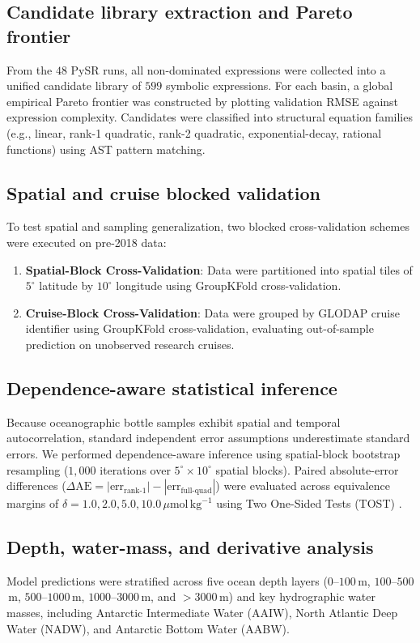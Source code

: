 

\subsection{Candidate library extraction and Pareto frontier}
From the $48$ PySR runs, all non-dominated expressions were collected into a unified candidate library of $599$ symbolic expressions. For each basin, a global empirical Pareto frontier was constructed by plotting validation RMSE against expression complexity. Candidates were classified into structural equation families (e.g., linear, rank-1 quadratic, rank-2 quadratic, exponential-decay, rational functions) using AST pattern matching.

\subsection{Spatial and cruise blocked validation}
To test spatial and sampling generalization, two blocked cross-validation schemes were executed on pre-2018 data:
\begin{enumerate}[label=(\roman*)]
\item \textbf{Spatial-Block Cross-Validation}: Data were partitioned into spatial tiles of $5^\circ$ latitude by $10^\circ$ longitude using GroupKFold cross-validation.
\item \textbf{Cruise-Block Cross-Validation}: Data were grouped by GLODAP cruise identifier using GroupKFold cross-validation, evaluating out-of-sample prediction on unobserved research cruises.
\end{enumerate}

\subsection{Dependence-aware statistical inference}
Because oceanographic bottle samples exhibit spatial and temporal autocorrelation, standard independent error assumptions underestimate standard errors. We performed dependence-aware inference using spatial-block bootstrap resampling ($1{,}000$ iterations over $5^\circ \times 10^\circ$ spatial blocks). Paired absolute-error differences ($\Delta\mathrm{AE} = |\mathrm{err}_{\text{rank-1}}| - |\mathrm{err}_{\text{full-quad}}|$) were evaluated across equivalence margins of $\delta = 1.0, 2.0, 5.0, 10.0\,\mu\mathrm{mol}\,\mathrm{kg}^{-1}$ using Two One-Sided Tests (TOST) \citep{Schuirmann1987}.

\subsection{Depth, water-mass, and derivative analysis}
Model predictions were stratified across five ocean depth layers ($0$--$100$\,m, $100$--$500$\,m, $500$--$1000$\,m, $1000$--$3000$\,m, and $>3000$\,m) and key hydrographic water masses, including Antarctic Intermediate Water (AAIW), North Atlantic Deep Water (NADW), and Antarctic Bottom Water (AABW). 

